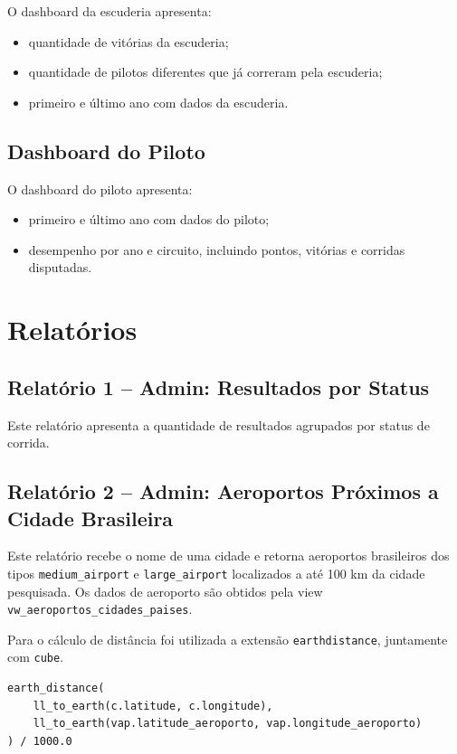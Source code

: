 \documentclass[12pt,a4paper]{article}
\begin{document}
O dashboard da escuderia apresenta:

\begin{itemize}
    \item quantidade de vitórias da escuderia;
    \item quantidade de pilotos diferentes que já correram pela escuderia;
    \item primeiro e último ano com dados da escuderia.
\end{itemize}

\subsection{Dashboard do Piloto}

O dashboard do piloto apresenta:

\begin{itemize}
    \item primeiro e último ano com dados do piloto;
    \item desempenho por ano e circuito, incluindo pontos, vitórias e corridas disputadas.
\end{itemize}

\section{Relatórios}

\subsection{Relatório 1 -- Admin: Resultados por Status}

Este relatório apresenta a quantidade de resultados agrupados por status de corrida.

\subsection{Relatório 2 -- Admin: Aeroportos Próximos a Cidade Brasileira}

Este relatório recebe o nome de uma cidade e retorna aeroportos brasileiros dos tipos \texttt{medium\_airport} e \texttt{large\_airport} localizados a até 100 km da cidade pesquisada. Os dados de aeroporto são obtidos pela view \texttt{vw\_aeroportos\_cidades\_paises}.

Para o cálculo de distância foi utilizada a extensão \texttt{earthdistance}, juntamente com \texttt{cube}.

\begin{lstlisting}[style=sqlstyle]
earth_distance(
    ll_to_earth(c.latitude, c.longitude),
    ll_to_earth(vap.latitude_aeroporto, vap.longitude_aeroporto)
) / 1000.0
\end{lstlisting}
\end{document}
